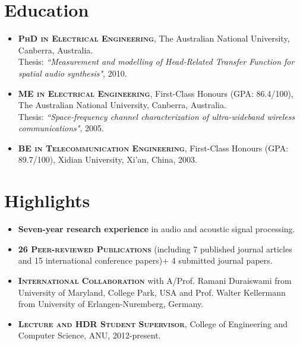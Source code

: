 \documentclass[11pt]{article}
\begin{document}
\begin{itemize}
%
%
%
%

\end{itemize}

\section*{Education}
\begin{itemize}
\item \textsc{\textbf{PhD in Electrical Engineering}}, The Australian National University,
Canberra, Australia.\\
Thesis: \emph{``Measurement and modelling of Head-Related Transfer Function for spatial audio synthesis"},
2010.
\item \textsc{\textbf{ME in Electrical Engineering}}, First-Class Honours (GPA: 86.4/100), The Australian National University, Canberra, Australia.\\
Thesis: \emph{``Space-frequency channel characterization of ultra-wideband wireless
communications"}, 2005.
\item \textsc{\textbf{BE in Telecommunication Engineering}},
First-Class Honours (GPA: 89.7/100), Xidian University, Xi'an, China, 2003.
\end{itemize}

\section*{Highlights}
%
\begin{itemize}
%
\item \textbf{Seven-year research experience} in audio and acoustic signal processing.

\item \textsc{\textbf{26 Peer-reviewed Publications}} (including 7 published journal articles and 15 international conference papers)+ 4 submitted journal papers.

\item \textsc{\textbf{International Collaboration}} with A/Prof. Ramani Duraiswami from University of Maryland, College Park, USA and Prof. Walter Kellermann from University of Erlangen-Nuremberg, Germany.

\item \textsc{\textbf{Lecture and HDR Student Supervisor}}, College of Engineering and Computer Science, ANU, 2012-present.
%

\end{itemize}
\end{document}
